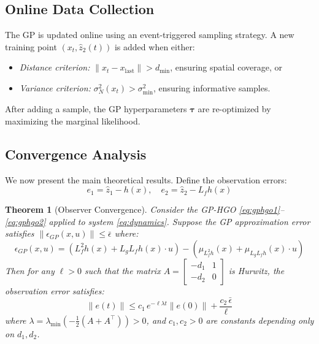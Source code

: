 \documentclass[letterpaper, 10 pt, conference]{ieeeconf}
\newtheorem{theorem}{Theorem}
\begin{document}
\subsection{Online Data Collection}

The GP is updated online using an event-triggered sampling strategy. A new training point $(x_t, \hat{z}_2(t))$ is added when either:
\begin{itemize}
    \item \emph{Distance criterion:} $\|x_t - x_{\text{last}}\| > d_{\min}$, ensuring spatial coverage, or
    \item \emph{Variance criterion:} $\sigma_N^2(x_t) > \sigma_{\min}^2$, ensuring informative samples.
\end{itemize}

After adding a sample, the GP hyperparameters $\bm{\tau}$ are re-optimized by maximizing the marginal likelihood.

\subsection{Convergence Analysis}

We now present the main theoretical results. Define the observation errors:
\begin{equation}
    e_1 = \hat{z}_1 - h(x), \quad e_2 = \hat{z}_2 - L_f h(x)
\end{equation}

\begin{theorem}[Observer Convergence]\label{thm:convergence}
Consider the GP-HGO \eqref{eq:gphgo1}--\eqref{eq:gphgo2} applied to system \eqref{eq:dynamics}. Suppose the GP approximation error satisfies $\|\epsilon_{GP}(x,u)\| \leq \bar{\epsilon}$ where:
\begin{equation}
    \epsilon_{GP}(x,u) = (L_f^2 h(x) + L_g L_f h(x) \cdot u) - (\mu_{L_f^2 h}(x) + \mu_{L_g L_f h}(x) \cdot u)
\end{equation}
Then for any $\ell > 0$ such that the matrix $A = \begin{bmatrix} -d_1 & 1 \\ -d_2 & 0 \end{bmatrix}$ is Hurwitz, the observation error satisfies:
\begin{equation}\label{eq:error_bound}
    \|e(t)\| \leq c_1 \, e^{-\ell \lambda t} \|e(0)\| + \frac{c_2 \, \bar{\epsilon}}{\ell}
\end{equation}
where $\lambda = \lambda_{\min}(-\frac{1}{2}(A + A^\top)) > 0$, and $c_1, c_2 > 0$ are constants depending only on $d_1, d_2$.
\end{theorem}
\end{document}

